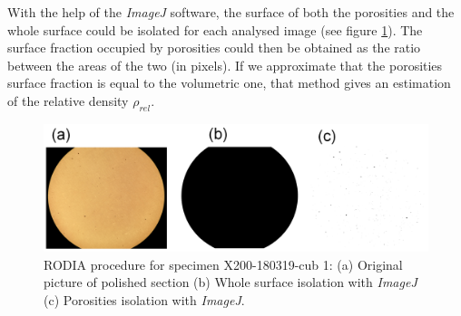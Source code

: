 With the help of the \textit{ImageJ} software, the surface of both the porosities and the whole surface could be isolated for each analysed image (see figure \ref{fig:ImageJ}). The surface fraction occupied by porosities could then be obtained as the ratio between the areas of the two (in pixels). If we approximate that the porosities surface fraction is equal to the volumetric one, that method gives an estimation of the relative density $\rho_{rel}$.

 \begin{center}
\begin{table}[ht]
\noindent{}

\caption[Polishing routine for Al-Si alloys]{Polishing routine for Al-Si alloys}
\label{tab:pol}
\end{table}
 \end{center}


\begin{figure}[th]
\centering
\centerline{\includegraphics[scale=0.29]{Images/ImageJ-cub1}}
\decoRule
\caption[RODIA procedure for specimen X200-180319-cub 1: (a) Original picture of polished section (b) Whole surface isolation with \textit{ImageJ} (c) Porosities isolation with \textit{ImageJ}.]{RODIA procedure for specimen X200-180319-cub 1: (a) Original picture of polished section (b) Whole surface isolation with \textit{ImageJ} (c) Porosities isolation with \textit{ImageJ}.}
\label{fig:ImageJ}
\end{figure}

